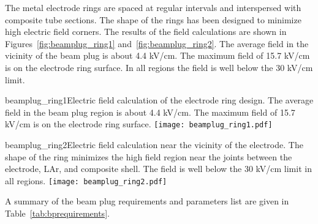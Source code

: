 The metal electrode rings are spaced at regular intervals and interspersed with composite tube sections. The shape of the rings has been designed to minimize high electric field corners. The results of the field calculations are shown in Figures~\ref{fig:beamplug_ring1} and~\ref{fig:beamplug_ring2}. The average field in the vicinity of the beam plug is about 4.4 kV/cm. The maximum field of 15.7 kV/cm is on the electrode ring surface. In all regions the field is well below the 30 kV/cm limit.

\begin{cdrfigure}{beamplug_ring1}{Electric field calculation of the electrode ring design. The average field in the beam plug region is about 4.4 kV/cm. The maximum field of 15.7 kV/cm is on the electrode ring surface. }
  \texttt{[image: beamplug\_ring1.pdf]}
\end{cdrfigure}

\begin{cdrfigure}{beamplug_ring2}{Electric field calculation near the vicinity of the electrode. The shape of the ring minimizes the high field region near the joints between the electrode, LAr, and composite shell. The field is well below the 30 kV/cm limit in all regions.}
  \texttt{[image: beamplug\_ring2.pdf]}
\end{cdrfigure}

A summary of the beam plug requirements and parameters list are given in Table~\ref{tab:bprequirements}.


